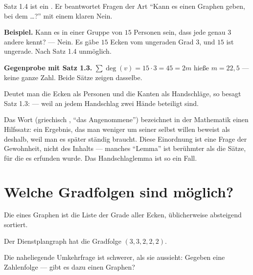 \begin{merksatz}
\begin{center}
\begin{minipage}{0.9\textwidth}
Satz 1.4 ist ein . Er beantwortet Fragen der Art \enquote{Kann es einen Graphen geben, bei dem \ldots?} mit einem klaren Nein.

\textbf{Beispiel.} Kann es in einer Gruppe von $15$ Personen sein, dass jede genau $3$ andere kennt? --- Nein. Es gäbe $15$ Ecken vom ungeraden Grad $3$, und $15$ ist ungerade. Nach Satz 1.4 unmöglich.

\textbf{Gegenprobe mit Satz 1.3.} $\sum \deg(v) = 15 \cdot 3 = 45 = 2m$ hieße $m = 22{,}5$ --- keine ganze Zahl. Beide Sätze zeigen dasselbe.
\end{minipage}
\end{center}
\end{merksatz}

\begin{geschichte}
Deutet man die Ecken als Personen und die Kanten als Handschläge, so besagt Satz 1.3:  --- weil an jedem Handschlag zwei Hände beteiligt sind.

Das Wort  (griechisch , \enquote{das Angenommene}) bezeichnet in der Mathematik einen Hilfssatz: ein Ergebnis, das man weniger um seiner selbst willen beweist als deshalb, weil man es später ständig braucht. Diese Einordnung ist eine Frage der Gewohnheit, nicht des Inhalts --- manches \enquote{Lemma} ist berühmter als die Sätze, für die es erfunden wurde. Das Handschlaglemma ist so ein Fall.
\end{geschichte}

\section{Welche Gradfolgen sind möglich?}

\begin{definition}
Die  eines Graphen ist die Liste der Grade aller Ecken, üblicherweise absteigend sortiert.
\end{definition}

Der Dienstplangraph hat die Gradfolge $(3,3,2,2,2)$.

Die naheliegende Umkehrfrage ist schwerer, als sie aussieht: Gegeben eine Zahlenfolge --- gibt es dazu einen Graphen?

